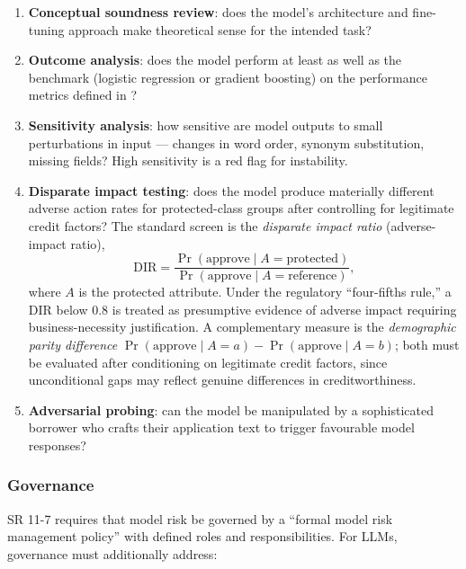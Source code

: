 \begin{context}
\begin{enumerate}
  \item \textbf{Conceptual soundness review}: does the model's architecture and fine-tuning approach make theoretical sense for the intended task?
  \item \textbf{Outcome analysis}: does the model perform at least as well as the benchmark (logistic regression or gradient boosting) on the performance metrics defined in ?
  \item \textbf{Sensitivity analysis}: how sensitive are model outputs to small perturbations in input --- changes in word order, synonym substitution, missing fields? High sensitivity is a red flag for instability.
  \item \textbf{Disparate impact testing}: does the model produce materially different adverse action rates for protected-class groups after controlling for legitimate credit factors? The standard screen is the \emph{disparate impact ratio} (adverse-impact ratio),
        \begin{equation}
          \label{eq:disparate-impact}
          \mathrm{DIR} = \frac{\Pr(\text{approve} \mid A = \text{protected})}{\Pr(\text{approve} \mid A = \text{reference})},
        \end{equation}
        where $A$ is the protected attribute. Under the regulatory ``four-fifths rule,'' a $\mathrm{DIR}$ below $0.8$ is treated as presumptive evidence of adverse impact requiring business-necessity justification. A complementary measure is the \emph{demographic parity difference} $\Pr(\text{approve}\mid A=a)-\Pr(\text{approve}\mid A=b)$; both must be evaluated after conditioning on legitimate credit factors, since unconditional gaps may reflect genuine differences in creditworthiness.
  \item \textbf{Adversarial probing}: can the model be manipulated by a sophisticated borrower who crafts their application text to trigger favourable model responses?
\end{enumerate}

\subsubsection*{Governance}

SR 11-7 requires that model risk be governed by a ``formal model risk management policy'' with defined roles and responsibilities. For LLMs, governance must additionally address:


\end{context}
